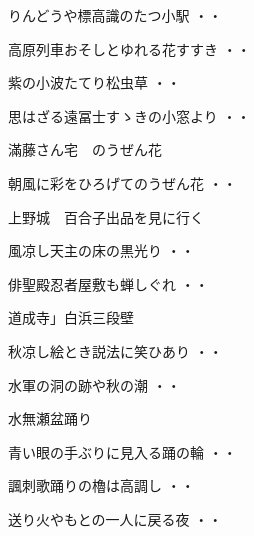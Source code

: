 \begin{shiika}りんどうや標高識のたつ小駅
\hfill{・・}\end{shiika}
\begin{shiika}高原列車おそしとゆれる花すすき
\hfill{・・}\end{shiika}
\begin{shiika}紫の小波たてり松虫草
\hfill{・・}\end{shiika}
\begin{shiika}思はざる遠冨士すゝきの小窓より
\hfill{・・}\end{shiika}
\vspace{0.6cm}
滿藤さん宅　のうぜん花
\begin{shiika}朝風に彩をひろげてのうぜん花
\hfill{・・}\end{shiika}
\vspace{0.6cm}
上野城　百合子出品を見に行く
\begin{shiika}風凉し天主の床の黒光り
\hfill{・・}\end{shiika}
\vspace{0.6cm}
\begin{shiika}俳聖殿忍者屋敷も蝉しぐれ
\hfill{・・}\end{shiika}
\vspace{0.6cm}
道成寺」白浜三段壁
\begin{shiika}秋凉し絵とき説法に笑ひあり
\hfill{・・}\end{shiika}
\begin{shiika}水軍の洞の跡や秋の潮
\hfill{・・}\end{shiika}
\vspace{0.6cm}
水無瀬盆踊り
\begin{shiika}青い眼の手ぶりに見入る踊の輪
\hfill{・・}\end{shiika}
\begin{shiika}諷刺歌踊りの櫓は高調し
\hfill{・・}\end{shiika}
\begin{shiika}送り火やもとの一人に戻る夜
\hfill{・・}\end{shiika}
